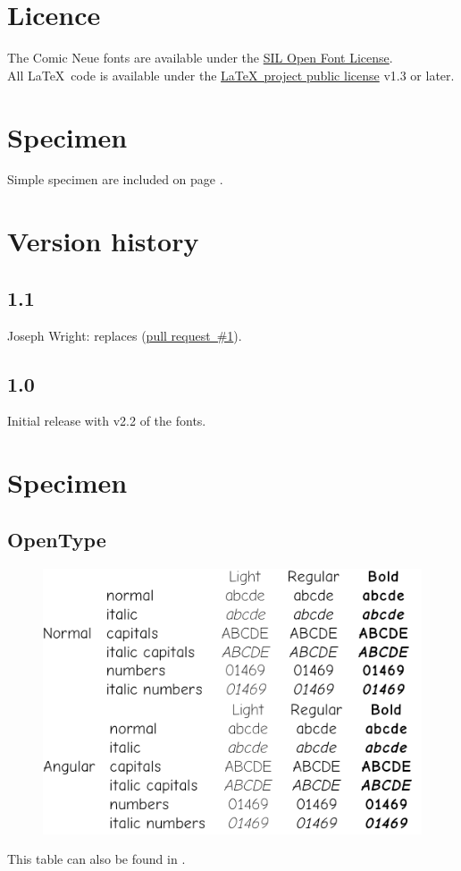 \documentclass[10pt,a4paper,english,twocolumn]{article}
\begin{document}
\section{Licence}
The Comic Neue fonts are available under the \href{http://scripts.sil.org/OFL}{SIL Open Font License}.\\
All \LaTeX\ code is available under the \href{http://www.latex-project.org/lppl/}{\LaTeX\ project public license} v1.3 or later.

\section{Specimen}
Simple specimen are included on page \pageref{sec:specimen}.

\section{Version history}

\subsection*{1.1}
\begin{itemize*}
	\item Joseph Wright:  replaces  (\href{https://github.com/silkeh/latex-raleway/pull/1}{pull request~\#1}).
\end{itemize*}

\subsection*{1.0}
\begin{itemize*}
	\item Initial release with v2.2 of the fonts.
\end{itemize*}

\onecolumn
\clearpage

\section{Specimen}
\label{sec:specimen}

\subsection{OpenType}
\begin{figure}[ht]
	\centering
	\includegraphics[width=.7\textwidth]{comicneue-otf-specimen}
\end{figure}
This table can also be found in .
\end{document}
